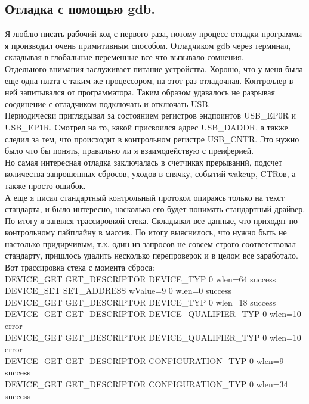 \documentclass[12pt,a4paper]{article}
\begin{document}
\subsection{Отладка с помощью gdb.}
    Я люблю писать рабочий код с первого раза, потому процесс отладки
    программы я производил очень примитивным способом. Отладчиком gdb через
    терминал, складывая в глобальные переменные все что вызывало сомнения.\\
    Отдельного внимания заслуживает питание устройства. Хорошо, что у меня была еще
    одна плата с таким же процессором, на этот раз отладочная. Контроллер
    в ней запитывался от программатора. Таким образом удавалось не разрывая
    соединение с отладчиком подключать и отключать USB.\\
    Периодически приглядывал за состоянием регистров эндпоинтов USB\_EP0R и
    USB\_EP1R. Смотрел на то, какой присвоился адрес USB\_DADDR, а также
    следил за тем, что происходит в контрольном регистре USB_CNTR.
    Это нужно было что бы понять, правильно ли я взаимодействую с преиферией.\\
    Но самая интересная отладка заключалась в счетчиках прерываний, подсчет
    количества запрошенных сбросов, уходов в спячку, событий wakeup, CTRов, а
    также просто ошибок.\\
    А еще я писал стандартный контрольный протокол опираясь только на
    текст стандарта, и было интересно, насколько его будет понимать стандартный
    драйвер. По итогу я занялся трассировкой стека. Складывал все данные, что
    приходят по контрольному пайплайну в массив. По итогу выяснилось, что нужно быть
    не настолько придирчивым, т.к. один из запросов не совсем строго
    соответствовал стандарту, пришлось удалить несколько перепроверок и
    в целом все заработало. Вот трассировка стека с момента сброса:\\
    DEVICE_GET GET\_DESCRIPTOR DEVICE\_TYP 0 wlen=64 success\\
    DEVICE\_SET SET\_ADDRESS wValue=9 0 wlen=0 success\\
    DEVICE\_GET GET\_DESCRIPTOR DEVICE\_TYP 0 wlen=18 success\\
    DEVICE\_GET GET\_DESCRIPTOR DEVICE\_QUALIFIER_TYP 0 wlen=10 error\\
    DEVICE\_GET GET\_DESCRIPTOR DEVICE\_QUALIFIER_TYP 0 wlen=10 error\\
    DEVICE\_GET GET\_DESCRIPTOR CONFIGURATION\_TYP 0 wlen=9 success\\
    DEVICE\_GET GET\_DESCRIPTOR CONFIGURATION\_TYP 0 wlen=34 success\\
\end{document}
